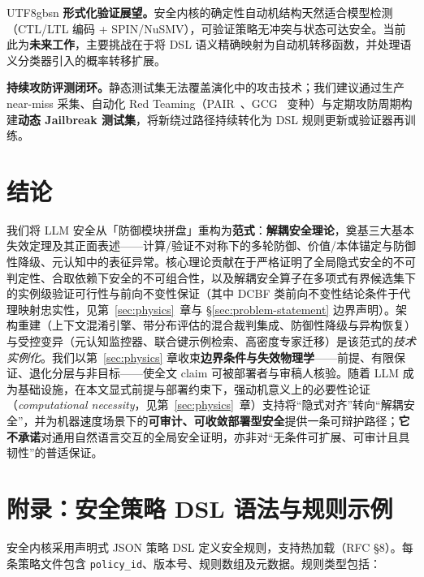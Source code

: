 \documentclass[letterpaper,twocolumn,10pt]{article}
\begin{document}
\begin{CJK}{UTF8}{gbsn}
\textbf{形式化验证展望。}安全内核的确定性自动机结构天然适合模型检测（CTL/LTL 编码 + SPIN/NuSMV），可验证策略无冲突与状态可达安全。当前此为\textbf{未来工作}，主要挑战在于将 DSL 语义精确映射为自动机转移函数，并处理语义分类器引入的概率转移扩展。

\textbf{持续攻防评测闭环。}静态测试集无法覆盖演化中的攻击技术；我们建议通过生产 near-miss 采集、自动化 Red Teaming（PAIR~\cite{pair-jailbreak}、GCG~\cite{gcg} 变种）与定期攻防周期构建\textbf{动态 Jailbreak 测试集}，将新绕过路径持续转化为 DSL 规则更新或验证器再训练。

\section{结论}

我们将 LLM 安全从「防御模块拼盘」重构为\textbf{范式}：\textbf{解耦安全理论}，奠基三大基本失效定理及其正面表述——计算/验证不对称下的多轮防御、价值/本体锚定与防御性降级、元认知中的表征异常。核心理论贡献在于严格证明了全局隐式安全的不可判定性、合取依赖下安全的不可组合性，以及解耦安全算子在多项式有界候选集下的实例级验证可行性与前向不变性保证（其中 DCBF 类前向不变性结论条件于代理映射忠实性，见第~\ref{sec:physics}~章与 \S\ref{sec:problem-statement} 边界声明）。架构重建（上下文混淆引擎、带分布评估的混合裁判集成、防御性降级与异构恢复）与受控变异（元认知监控器、联合键示例检索、高密度专家迁移）是该范式的\emph{技术实例化}。我们以第~\ref{sec:physics} 章收束\textbf{边界条件与失效物理学}——前提、有限保证、退化分层与非目标——使全文 claim 可被部署者与审稿人核验。随着 LLM 成为基础设施，在本文显式前提与部署约束下，强动机意义上的必要性论证（\textit{computational necessity}，见第~\ref{sec:physics}~章）支持将``隐式对齐''转向``解耦安全''，并为机器速度场景下的\textbf{可审计、可收敛部署型安全}提供一条可辩护路径；\textbf{它不承诺}对通用自然语言交互的全局安全证明，亦非对``无条件可扩展、可审计且具韧性''的普适保证。

\appendix

\section{附录：安全策略 DSL 语法与规则示例}
\label{sec:appendix-dsl}

安全内核采用声明式 JSON 策略 DSL 定义安全规则，支持热加载（RFC \S 8）。每条策略文件包含 \texttt{policy\_id}、版本号、规则数组及元数据。规则类型包括：


\end{CJK}
\end{document}
